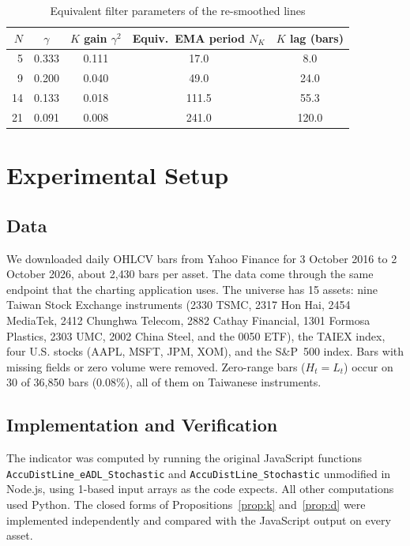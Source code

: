 \documentclass[conference]{IEEEtran}
\begin{document}
\begin{table}[t]
\caption{Equivalent filter parameters of the re-smoothed lines}
\label{tab:equiv}
\centering
\begin{tabular}{rcccc}
\toprule
$N$ & $\gamma$ & $K$ gain $\gamma^2$ & Equiv.\ EMA period $N_K$ & $K$ lag (bars)\\
\midrule
5  & 0.333 & 0.111 & 17.0  & 8.0\\
9  & 0.200 & 0.040 & 49.0  & 24.0\\
14 & 0.133 & 0.018 & 111.5 & 55.3\\
21 & 0.091 & 0.008 & 241.0 & 120.0\\
\bottomrule
\end{tabular}
\end{table}

\section{Experimental Setup}\label{sec:setup}
\subsection{Data}
We downloaded daily OHLCV bars from Yahoo Finance for 3 October 2016 to 2 October 2026, about 2{,}430 bars per asset. The data come through the same endpoint that the charting application uses. The universe has 15 assets: nine Taiwan Stock Exchange instruments (2330 TSMC, 2317 Hon Hai, 2454 MediaTek, 2412 Chunghwa Telecom, 2882 Cathay Financial, 1301 Formosa Plastics, 2303 UMC, 2002 China Steel, and the 0050 ETF), the TAIEX index, four U.S. stocks (AAPL, MSFT, JPM, XOM), and the S\&P~500 index. Bars with missing fields or zero volume were removed. Zero-range bars ($H_t=L_t$) occur on 30 of 36{,}850 bars (0.08\%), all of them on Taiwanese instruments.

\subsection{Implementation and Verification}
The indicator was computed by running the original JavaScript functions \texttt{AccuDistLine\_eADL\_Stochastic} and \texttt{AccuDistLine\_Stochastic} unmodified in Node.js, using 1-based input arrays as the code expects. All other computations used Python. The closed forms of Propositions~\ref{prop:k} and~\ref{prop:d} were implemented independently and compared with the JavaScript output on every asset.
\end{document}
